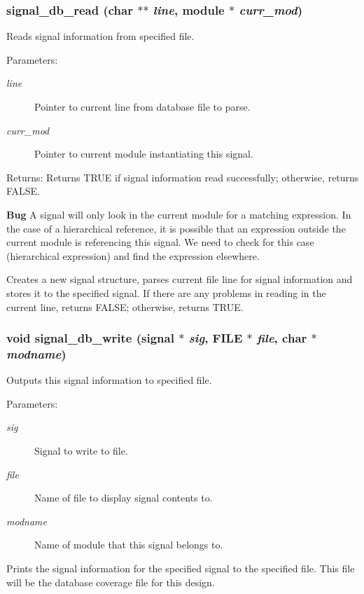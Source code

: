 \subsubsection{ signal\_\-db\_\-read (char $\ast$$\ast$ {\em line}, {\bf module} $\ast$ {\em curr\_\-mod})}\label{signal_8h_a3}


Reads signal information from specified file. 

\begin{Desc}
\item[Parameters:]
\begin{description}
\item[{\em line}]Pointer to current line from database file to parse. \item[{\em curr\_\-mod}]Pointer to current module instantiating this signal.\end{description}
\end{Desc}
\begin{Desc}
\item[Returns:]Returns TRUE if signal information read successfully; otherwise, returns FALSE.\end{Desc}


\begin{Desc}
\item[{\bf Bug}]A signal will only look in the current module for a matching expression. In the case of a hierarchical reference, it is possible that an expression outside the current module is referencing this signal. We need to check for this case (hierarchical expression) and find the expression elsewhere. \end{Desc}
Creates a new signal structure, parses current file line for signal information and stores it to the specified signal. If there are any problems in reading in the current line, returns FALSE; otherwise, returns TRUE. 
\subsubsection{\setlength{\rightskip}{0pt plus 5cm}void signal\_\-db\_\-write ({\bf signal} $\ast$ {\em sig}, FILE $\ast$ {\em file}, char $\ast$ {\em modname})}\label{signal_8h_a2}


Outputs this signal information to specified file. 

\begin{Desc}
\item[Parameters:]
\begin{description}
\item[{\em sig}]Signal to write to file. \item[{\em file}]Name of file to display signal contents to. \item[{\em modname}]Name of module that this signal belongs to.\end{description}
\end{Desc}
Prints the signal information for the specified signal to the specified file. This file will be the database coverage file for this design. 
